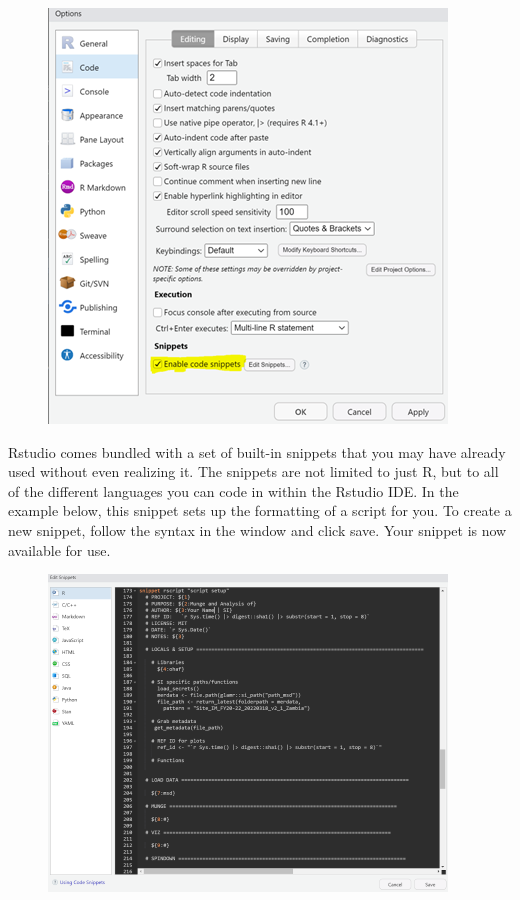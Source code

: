 \documentclass[
  letterpaper,
  DIV=11,
  numbers=noendperiod]{scrreprt}
\begin{document}
\begin{figure}

{\centering \includegraphics{./images/r_setup-snippets_global-options.png}

}

\end{figure}

Rstudio comes bundled with a set of built-in snippets that you may have
already used without even realizing it. The snippets are not limited to
just R, but to all of the different languages you can code in within the
Rstudio IDE. In the example below, this snippet sets up the formatting
of a script for you. To create a new snippet, follow the syntax in the
window and click save. Your snippet is now available for use.

\begin{figure}

{\centering \includegraphics{./images/r_setup-snippet-window.png}

}

\end{figure}
\end{document}
